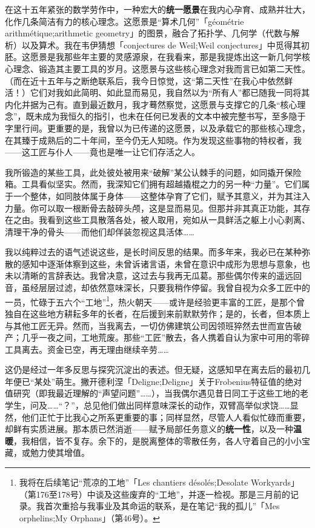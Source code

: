 在这十五年紧张的数学劳作中，一种宏大的\textbf{统一愿景}在我内心孕育、成熟并壮大，化作几条简洁有力的核心理念。这愿景是“算术几何”「géométrie arithmétique;arithmetic geometry」的图景，融合了拓扑学、几何学（代数与解析）以及算术。我在韦伊猜想「conjectures de Weil;Weil conjectures」中觅得其初胚。这愿景是我那些年主要的灵感源泉，在我看来，那是我提炼出这一新几何学核心理念、锻造其主要工具的岁月。这愿景与这些核心理念对我而言已如第二天性。（而在近十五年与之断绝联系后，我今日惊觉，这“第二天性”在我心中依然鲜活！）它们对我如此简明、如此显而易见，我自然以为“所有人”都已随我一同将其内化并据为己有。直到最近数月，我才蓦然察觉，这愿景与支撑它的几条“核心理念”，既未成为我恒久的指引，也未在任何已发表的文本中被完整书写，至多隐于字里行间。更重要的是，我曾以为已传递的这愿景，以及承载它的那些核心理念，在其臻于成熟后的二十年间，至今仍无人知晓。作为发现这些事物的特权者，我——这工匠与仆人——竟也是唯一让它们存活之人。

我所锻造的某些工具，此处彼处被用来“破解”某公认棘手的问题，如同撬开保险箱。工具看似坚实。然而，我深知它们拥有超越撬棍之力的另一种“力量”。它们属于一个整体，如同肢体属于身体——这整体孕育了它们，赋予其意义，并为其注入力量。你可以取一根断骨去敲碎头颅，这是显而易见。但那并非其真正功能，其存在之由。我看到这些工具散落各处，被人取用，宛如从一具鲜活之躯上小心剥离、清理干净的骨头——而他们却佯装忽视这具活体……

我以纯粹过去的语气述说这些，是长时间反思的结果。而多年来，我必已在某种弥散的感知中逐渐体察到这些，未曾诉诸言语，未曾在意识中成形为思想与意象，也未以清晰的言辞表达。我曾决意，这过去与我再无瓜葛。那些偶尔传来的遥远回音，虽经层层过滤，却依然意味深长，只要我稍作停留。我曾自视为众多工匠中的一员，忙碌于五六个“工地”\footnote{我将在后续笔记“荒凉的工地”「Les chantiers désolés;Desolate Workyards」（第176至178号）中谈及这些废弃的“工地”，并逐一检视。那是三月前的记录。我首次重拾与我事业及其命运的联系，是在笔记“我的孤儿”「Mes orphelins;My Orphans」（第46号）。}，热火朝天——或许是经验更丰富的工匠，是那个曾独自在这些地方耕耘多年的长者，在后援到来前默默劳作；是的，长者，但本质上与其他工匠无异。然而，当我离去，一切仿佛建筑公司因领班猝然去世而宣告破产；几乎一夜之间，工地荒废。那些“工匠”散去，各人携着自认为家中可用的零碎工具离去。资金已空，再无理由继续辛劳……

这仍是经过一年多反思与探究沉淀出的表述。但无疑，这感知早在离去后的最初几年便已“某处”萌生。撇开德利涅「Deligne;Deligne」关于Frobenius特征值的绝对值研究（即我最近理解的“声望问题”……），当我偶尔遇见昔日同工于这些工地的老学生，问及……“？”，总见他们做出同样意味深长的动作，双臂高举似求饶……显然，他们正忙于比我心之所系更重要的事；同样显然，尽管人人看似忙碌而重要，却鲜有实质进展。那本质已然消逝——赋予局部任务意义的\textbf{统一性}，以及一种\textbf{温暖}，我相信，皆不复存。余下的，是脱离整体的零散任务，各人守着自己的小小宝藏，或勉力使其增值。

